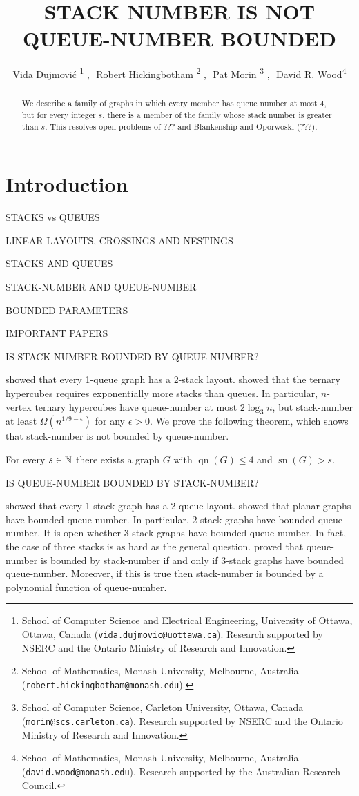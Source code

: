 \documentclass[kpfonts]{patmorin}
\title{\MakeUppercase{Stack Number is not Queue-Number Bounded}}
\author{Vida Dujmovi\'c%
	\thanks{School of Computer Science and Electrical Engineering,
		University of Ottawa, Ottawa, Canada (\texttt{vida.dujmovic@uottawa.ca}).
		Research supported by NSERC and the Ontario Ministry of Research and Innovation.}
	,\,\,
	Robert Hickingbotham%
	\thanks{School of Mathematics, Monash University, Melbourne, Australia (\texttt{robert.hickingbotham@monash.edu}).}
	,\,\,
	Pat Morin%
	\thanks{School of Computer Science, Carleton University, Ottawa, Canada (\texttt{morin@scs.carleton.ca}). Research  supported by NSERC and the Ontario Ministry of Research and Innovation.}
	,\,\,
	David R. Wood\thanks{School of Mathematics, Monash University, Melbourne, Australia (\texttt{david.wood@monash.edu}). Research supported by the Australian Research Council.}
}
\DeclareMathOperator{\sn}{sn}
\DeclareMathOperator{\qn}{qn}
\renewcommand{\le}{\leqslant}
\begin{document}
\maketitle

\begin{abstract}
  We describe a family of graphs in which every member has queue number at most 4, but for every integer $s$, there is a member of the family whose stack number is greater than $s$. This resolves open problems of ??? and Blankenship and Oporwoski (???).
\end{abstract}

\section{Introduction}

STACKS vs QUEUES

LINEAR LAYOUTS, CROSSINGS AND NESTINGS

STACKS AND QUEUES

STACK-NUMBER AND QUEUE-NUMBER

BOUNDED PARAMETERS

IMPORTANT PAPERS \citep{HLR92,CLR87,Pupyrev20,DujWoo05,HR92}

IS STACK-NUMBER BOUNDED BY QUEUE-NUMBER?

\citet{HLR92} showed that every 1-queue graph has a 2-stack layout.
\citet{HLR92} showed that the ternary hypercubes requires exponentially more stacks than queues. In particular, $n$-vertex ternary hypercubes have queue-number at most $2 \log_3 n$, but stack-number at least $\Omega(n^{1/9-\epsilon})$ for any $\epsilon>0$. We prove the following theorem, which shows that stack-number is not bounded by queue-number.

\begin{thm}\label{family}
 For every $s\in \mathbb{N}$ there exists a graph $G$ with $\qn(G)\le 4$ and $\sn(G)>s$.
\end{thm}

IS QUEUE-NUMBER BOUNDED BY STACK-NUMBER?

\citet{HLR92} showed that every 1-stack graph has a 2-queue layout. \citet{DJMMUW20} showed that planar graphs have bounded queue-number. In particular, 2-stack graphs have bounded queue-number. It is open whether 3-stack graphs have bounded queue-number. In fact, the case of three stacks is as hard as the general question. \citet{DujWoo05} proved that queue-number is bounded by stack-number if and only if 3-stack graphs have bounded queue-number. Moreover, if this is true then stack-number is bounded by a polynomial function of queue-number.
\end{document}
